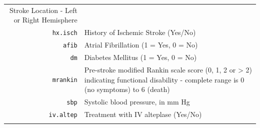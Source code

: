 \documentclass[]{book}
\theoremstyle{definition}
\theoremstyle{definition}
\theoremstyle{definition}
\theoremstyle{remark}
\begin{document}
\begin{longtable}[]{@{}rl@{}}
\begin{minipage}[t]{0.55\columnwidth}
Stroke Location - Left or Right Hemisphere\strut
\end{minipage}\tabularnewline
\begin{minipage}[t]{0.16\columnwidth}\raggedleft\strut
\texttt{hx.isch}\strut
\end{minipage} & \begin{minipage}[t]{0.55\columnwidth}\raggedright\strut
History of Ischemic Stroke (Yes/No)\strut
\end{minipage}\tabularnewline
\begin{minipage}[t]{0.16\columnwidth}\raggedleft\strut
\texttt{afib}\strut
\end{minipage} & \begin{minipage}[t]{0.55\columnwidth}\raggedright\strut
Atrial Fibrillation (1 = Yes, 0 = No)\strut
\end{minipage}\tabularnewline
\begin{minipage}[t]{0.16\columnwidth}\raggedleft\strut
\texttt{dm}\strut
\end{minipage} & \begin{minipage}[t]{0.55\columnwidth}\raggedright\strut
Diabetes Mellitus (1 = Yes, 0 = No)\strut
\end{minipage}\tabularnewline
\begin{minipage}[t]{0.16\columnwidth}\raggedleft\strut
\texttt{mrankin}\strut
\end{minipage} & \begin{minipage}[t]{0.55\columnwidth}\raggedright\strut
Pre-stroke modified Rankin scale score (0, 1, 2 or \textgreater{} 2)
indicating functional disability - complete range is 0 (no symptoms) to
6 (death)\strut
\end{minipage}\tabularnewline
\begin{minipage}[t]{0.16\columnwidth}\raggedleft\strut
\texttt{sbp}\strut
\end{minipage} & \begin{minipage}[t]{0.55\columnwidth}\raggedright\strut
Systolic blood pressure, in mm Hg\strut
\end{minipage}\tabularnewline
\begin{minipage}[t]{0.16\columnwidth}\raggedleft\strut
\texttt{iv.altep}\strut
\end{minipage} & \begin{minipage}[t]{0.55\columnwidth}\raggedright\strut
Treatment with IV alteplase (Yes/No)\strut
\end{minipage}\tabularnewline
\begin{minipage}[t]{0.16\columnwidth}\raggedleft\strut

\end{minipage}
\end{longtable}
\end{document}
